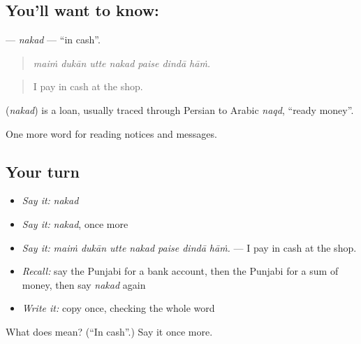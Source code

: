 \subsection*{You'll want to know: }
\textbf{} — \emph{nakad} — \textquotedblleft{}in cash\textquotedblright{}.

\begin{quote}
      
\end{quote}

\begin{quote}
\emph{maiṁ dukān utte nakad paise dindā hāṁ.}
\end{quote}

\begin{quote}
I pay in cash at the shop.
\end{quote}

\begin{cousinweb}
\textbf{} (\emph{nakad}) is a loan, usually traced through Persian to Arabic \emph{naqd}, \textquotedblleft{}ready money\textquotedblright{}.
\end{cousinweb}

\begin{grammarlens}[title={What you've built}]
One more word for reading notices and messages.
\end{grammarlens}

\subsection*{Your turn}
\begin{itemize}
\raggedright
  \item \emph{Say it:} \emph{nakad}
  \item \emph{Say it:} \emph{nakad}, once more
  \item \emph{Say it:} \emph{maiṁ dukān utte nakad paise dindā hāṁ.} — I pay in cash at the shop.
  \item \emph{Recall:} say the Punjabi for a bank account, then the Punjabi for a sum of money, then say \emph{nakad} again
  \item \emph{Write it:} copy \textbf{} once, checking the whole word
\end{itemize}

\begin{tcolorbox}[breakable,colback=teal!4,colframe=teal!35!black,title={Before you move on}]
What does  mean? (\textquotedblleft{}In cash\textquotedblright{}.) Say it once more.
\end{tcolorbox}
